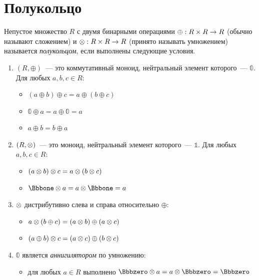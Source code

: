 \section{Полукольцо}
\label{sec:Semiring}

\begin{definition}[Полукольцо]
    Непустое множество $R$ с двумя бинарными операциями $\oplus: R \times R \to R$ (обычно называют сложением) и $\otimes: R \times R \to R$ (принято называть умножением) называется \emph{полукольцом}, если выполнены следующие условия.
    \begin{enumerate}
        \item $(R, \oplus)$~--- это коммутативный моноид, нейтральный элемент которого~--- $\Bbbzero$. Для любых $a, b, c \in R$:
              \begin{itemize}
                  \item $(a \oplus b) \oplus c = a \oplus (b \oplus c)$
                  \item $\Bbbzero \oplus a = a \oplus \Bbbzero = a$
                  \item $a \oplus b = b \oplus a$
              \end{itemize}
        \item $(R, \otimes)$~--- это моноид, нейтральный элемент которого~--- $\Bbbone$. Для любых $a, b, c \in R$:
              \begin{itemize}
                  \item $(a \otimes b) \otimes c = a \otimes (b \otimes c)$
                  \item $\Bbbone \opMult a = a \opMult \Bbbone = a$
              \end{itemize}
        \item $\otimes$ дистрибутивно слева и справа относительно $\oplus$:
              \begin{itemize}
                  \item $a \otimes (b \oplus c) = (a \otimes b) \oplus (a \otimes c)$
                  \item $(a \oplus b) \otimes c = (a \otimes c) \oplus (b \otimes c)$
              \end{itemize}
        \item $\Bbbzero$ является \emph{аннигилятором} по умножению:
              \begin{itemize}
                  \item для любых $a \in R$ выполнено $\Bbbzero \opMult a = a \opMult \Bbbzero = \Bbbzero$
              \end{itemize}
    \end{enumerate}
\end{definition}


